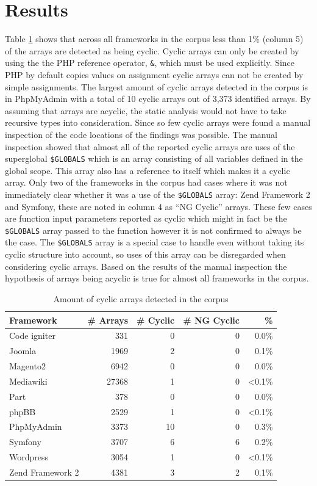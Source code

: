 \section{Results}
\label{sec:analysisResults}
Table \ref{tab:cyclic_arrays} shows that across all frameworks in the corpus less than 1\% (column 5) of the arrays are detected as being cyclic. Cyclic arrays can only be created by using the the PHP reference operator, \texttt{\&}, which must be used explicitly. Since PHP by default copies values on assignment cyclic arrays can not be created by simple assignments. The largest amount of cyclic arrays detected in the corpus is in PhpMyAdmin with a total of 10 cyclic arrays out of 3,373 identified arrays. By assuming that arrays are acyclic, the static analysis would not have to take recursive types into consideration. Since so few cyclic arrays were found a manual inspection of the code locations of the findings was possible. The manual inspection showed that almost all of the reported cyclic arrays are uses of the superglobal \texttt{\$GLOBALS} which is an array consisting of all variables defined in the global scope. This array also has a reference to itself which makes it a cyclic array. Only two of the frameworks in the corpus had cases where it was not immediately clear whether it was a use of the \texttt{\$GLOBALS} array: Zend Framework 2 and Symfony, these are noted in column 4 as ``NG Cyclic'' arrays. These few cases are function input parameters reported as cyclic which might in fact be the \texttt{\$GLOBALS} array passed to the function however it is not confirmed to always be the case. The \texttt{\$GLOBALS} array is a special case to handle even without taking its cyclic structure into account, so uses of this array can be disregarded when considering cyclic arrays. Based on the results of the manual inspection the hypothesis of arrays being acyclic is true for almost all frameworks in the corpus.

\begin{table}[htbp]
\begin{center}
\begin{tabular}{l| r  r  r  r}
Framework & \# Arrays & \# Cyclic & \# NG Cyclic & \%  \\ \hline \hline
Code igniter & 331 & 0 & 0 & 0.0\% \\
Joomla & 1969 & 2 & 0 & 0.1\% \\ 
Magento2 & 6942 & 0 & 0 & 0.0\%\\ 
Mediawiki & 27368 & 1 & 0 & <0.1\%\\ 
Part & 378 & 0 & 0 & 0.0\%\\ 
phpBB & 2529 & 1 & 0 & <0.1\%\\
PhpMyAdmin & 3373 & 10 & 0 & 0.3\%\\
Symfony & 3707 & 6 & 6 & 0.2\%\\ %
Wordpress & 3054 & 1 & 0 & <0.1\%\\ 
Zend Framework 2 & 4381 & 3 & 2 & 0.1\%
\end{tabular}
\end{center}
\caption{Amount of cyclic arrays detected in the corpus}
\label{tab:cyclic_arrays}
\end{table}

